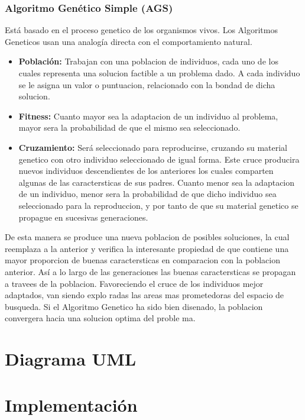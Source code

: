 \documentclass[12pt]{article}
\begin{document}
\subsubsection*{Algoritmo Genético Simple (AGS)}
Está basado en el proceso genetico de los organismos vivos. 
Los Algoritmos Geneticos usan una analogía directa con el comportamiento natural. 
\begin{itemize}
    \item \textbf{Población:} Trabajan con una poblacion de individuos, cada uno de los cuales representa una solucion factible a un problema dado. A cada individuo se le asigna un valor
 o puntuacion, relacionado con la bondad de dicha solucion. 
    \item \textbf{Fitness:} Cuanto mayor sea la adaptacion de un individuo al problema, mayor
 sera la probabilidad de que el mismo sea seleccionado.
    \item \textbf{Cruzamiento:} Será seleccionado para reproducirse, cruzando su material genetico con otro individuo seleccionado de igual forma. Este cruce producira nuevos individuos descendientes de los anteriores los cuales comparten algunas de las caractersticas de sus padres. Cuanto menor sea la adaptacion de un
 individuo, menor sera la probabilidad de que dicho individuo sea seleccionado para
 la reproduccion, y por tanto de que su material genetico se propague en sucesivas
 generaciones.\cite{ref7}
\end{itemize}
 
 De esta manera se produce una nueva poblacion de posibles soluciones, la cual reemplaza a la anterior y verifica  la interesante propiedad de que contiene una mayor
 proporcion de buenas caractersticas en comparacion con la poblacion anterior. Así a
 lo largo de las generaciones las buenas caractersticas se propagan a travees de la
 poblacion. Favoreciendo el cruce de los individuos mejor adaptados, van siendo explo
radas las areas mas prometedoras del espacio de busqueda. Si el Algoritmo Genetico
 ha sido bien disenado, la poblacion convergera hacia una solucion optima del proble
ma.
\section{Diagrama UML}
\begin{figure}[H]
    \centering
    
\end{figure}


\section{Implementación}
\end{document}
